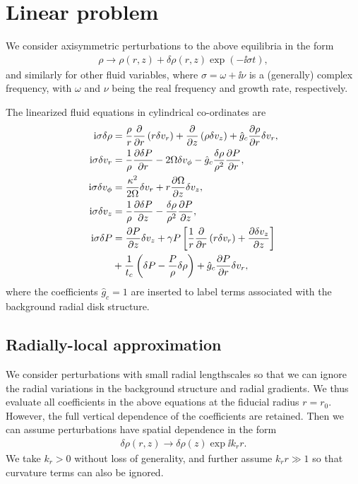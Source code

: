 \section{Linear problem}\label{linear}
We consider axisymmetric perturbations to the above equilibria in the
form 
\begin{align}
  \rho \to \rho(r, z) + \delta\rho(r,z)\exp{\left( - \ii\sigma
      t\right)},    
\end{align}
and similarly for other fluid variables, where $\sigma = \omega + \ii
\nu$ is a (generally) complex frequency, with $\omega$ and $\nu$ being
the real frequency and growth rate, respectively.

The linearized fluid equations in cylindrical co-ordinates are  
\begin{align}
  \mathrm{i}\sigma\delta\rho &= \frac{\rho}{r}\frac{\partial}{\partial r}\left(r\delta v_r\right) + \frac{\partial}{\partial
    z}\left(\rho\delta v_z\right)  + \hat{g}_c\frac{\partial\rho}{\partial r}\delta v_r,\\
  \mathrm{i}\sigma\delta v_r &= \frac{1}{\rho}\frac{\partial\delta P}{\partial r} - 2\Omega
  \delta v_\phi - \hat{g}_c\frac{\delta\rho}{\rho^2}\frac{\partial P}{\partial r},\\ 
  \mathrm{i}\sigma\delta v_\phi  &= \frac{\kappa^2}{2\Omega}\delta v_r +
  r\frac{\partial\Omega}{\partial z}\delta v_z,\\
  \mathrm{i} \sigma\delta v_z &= \frac{1}{\rho}\frac{\partial\delta P}{\partial z} -
  \frac{\delta \rho}{\rho^2}\frac{\partial P}{\partial z},\\
  \mathrm{i}\sigma\delta P &=\frac{\partial P}{\partial z}\delta v_z + \gamma P
  \left[\frac{1}{r}\frac{\partial}{\partial r}\left(r\delta v_r\right) + \frac{\partial
      \delta v_z}{\partial z}\right]\notag \\
  &+ \frac{1}{t_c}\left(\delta P -  
    \frac{P}{\rho}\delta\rho\right) + \hat{g}_c \frac{\partial P}{\partial r}\delta v_r,\label{full_energy1}
\end{align}
where the coefficients $\hat{g}_c=1$ are inserted to label terms
associated with the background radial disk structure. 

\subsection{Radially-local approximation}  
We consider perturbations with small radial lengthscales 
so that we can ignore the radial variations in the background
structure and radial gradients. We thus evaluate all coefficients in
the above equations at the fiducial radius $r=r_0$. However, the full
vertical dependence of the coefficients are retained. Then we can
assume perturbations have spatial dependence in the form
\begin{align}
  \delta \rho(r,z) \to \delta\rho(z)\exp{\ii k_r r}.
\end{align}
We take $k_r>0$ without loss of generality, and further assume $k_rr\gg1$ so that curvature terms can also be 
ignored.       

